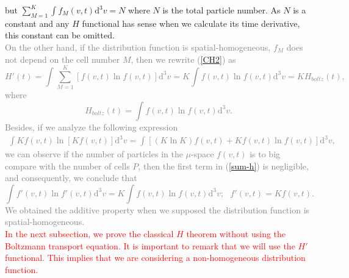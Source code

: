 \documentclass{article}
\begin{document}
  but $\sum_{M=1}^{K} \int f_M(v,t)\mathrm{d}^3v =N$ where $N$ is the total particle number. As $N$ is a constant and any $H$ functional has sense when we calculate its time derivative, this constant can be omitted. \\
  \textcolor{gray}{On the other hand, if the distribution function is spatial-homogeneous, $f_M$ does not depend on the cell number $M$, then we rewrite (\ref{CH2}) as
  \begin{equation}
      H'(t)=\int \sum_{M=1}^{K} [f(v,t)\ln f(v,t)] \mathrm{d}^{3}v = K\int  f(v,t) \ln f(v,t) \mathrm{d}^{3}v= K H_{boltz}(t), 
  \end{equation}
  where
  \begin{equation}
      H_{boltz}(t)=\int  f(v,t) \ln f(v,t) \mathrm{d}^{3}v.
  \end{equation}
  Besides, if we analyze the following expression
  \begin{eqnarray}
      \int Kf(v,t) \ln [Kf(v,t)] \mathrm{d}^{3}v = \int [(K\ln K)f(v,t) + Kf(v,t) \ln f(v,t)]\mathrm{d}^{3}v, \label{sum-h}
  \end{eqnarray}
  we can observe if the number of particles in the $\mu$-space $f(v,t)$ is to big compare with the number of cells $P$, then the first term in (\ref{sum-h}) is negligible, and consequently, we conclude that
  \begin{equation}
      \int f'(v,t) \ln f'(v,t) \mathrm{d}^{3}v = K\int f(v,t) \ln f(v,t) \mathrm{d}^{3}v; \ \ \ f'(v,t)= Kf(v,t). \label{aditive-property} 
  \end{equation}
  We obtained the additive property when we supposed the distribution function is spatial-homogeneous.}\\
  \textcolor{red}{In the next subsection, we prove the classical $H$ theorem without using the Boltzmann transport equation. It is important to remark that we will use the $H'$ functional. This implies that we are considering a non-homogeneous distribution function.}
  
  


\end{document}
